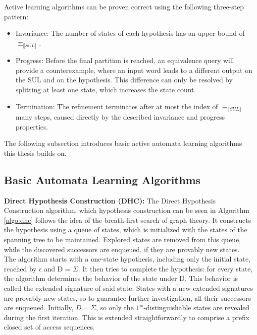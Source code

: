 Active learning algorithms can be proven correct using the following three-step pattern:
\begin{itemize}
	\item Invariance: The number of states of each hypothesis has an upper bound of $\equiv_{\llbracket SUL\rrbracket}$.
	\item Progress: Before the final partition is reached, an equivalence query will provide a counterexample, where an input word leads to a different output on the SUL and on the hypothesis. This difference can only be resolved by splitting at least one state, which increases the state count.
	\item Termination: The refinement terminates after at most the index of $\equiv_{\llbracket SUL\rrbracket}$ many steps, caused directly by the described invariance and progress properties.
\end{itemize}

The following subsection introduces basic active automata learning algorithms this thesis builds on.

\subsection{Basic Automata Learning Algorithms}
\textbf{Direct Hypothesis Construction (DHC):} 
The Direct Hypothesis Construction algorithm, which hypothesis construction can be seen in Algorithm \ref{algo:dhc}  follows the idea of the breath-first search of graph theory. It constructs the hypothesis using a queue of states, which is initialized with the states of the spanning tree to be maintained. Explored states are removed from this queue, while the discovered successors are enqueued, if they are provably new states. The algorithm starts with a one-state hypothesis, including only the initial state, reached by $\epsilon$ and D = $\Sigma$. It then tries to complete the hypothesis: for every state, the algorithm determines the behavior of the state under D. This behavior is called the extended signature of said state. States with a new extended signatures are provably new states, so to guarantee further investigation, all their successors are enqueued. Initially, $D=\Sigma$, so only the $1^=$-distinguishable states are revealed during the first iteration. This is extended straightforwardly to comprise a prefix closed set of access sequences. \cite{Steffen2011}\cite{10.1007/978-3-642-34781-8_19}

